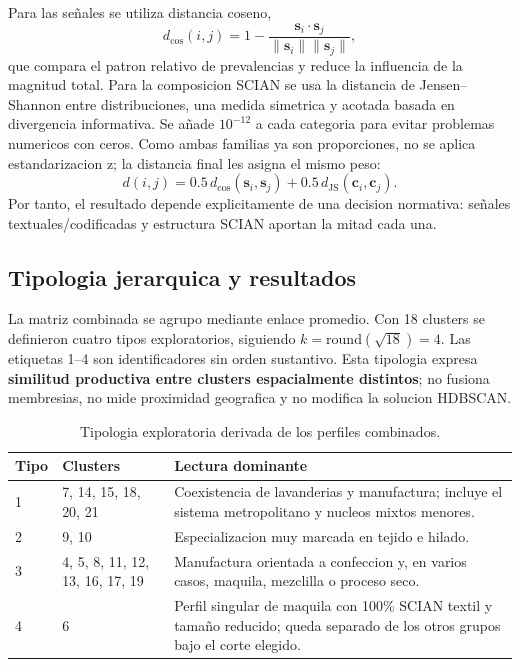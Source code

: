 \documentclass[11pt,letterpaper]{article}
\begin{document}
Para las señales se utiliza distancia coseno,
\[
d_{\mathrm{cos}}(i,j)=1-\frac{\mathbf{s}_i\cdot\mathbf{s}_j}{\lVert\mathbf{s}_i\rVert\lVert\mathbf{s}_j\rVert},
\]
que compara el patron relativo de prevalencias y reduce la influencia de la magnitud total. Para la composicion SCIAN se usa la distancia de Jensen--Shannon entre distribuciones, una medida simetrica y acotada basada en divergencia informativa. Se añade $10^{-12}$ a cada categoria para evitar problemas numericos con ceros. Como ambas familias ya son proporciones, no se aplica estandarizacion z; la distancia final les asigna el mismo peso:
\[
d(i,j)=0.5\,d_{\mathrm{cos}}(\mathbf{s}_i,\mathbf{s}_j)+0.5\,d_{\mathrm{JS}}(\mathbf{c}_i,\mathbf{c}_j).
\]
Por tanto, el resultado depende explicitamente de una decision normativa: señales textuales/codificadas y estructura SCIAN aportan la mitad cada una.

\subsection{Tipologia jerarquica y resultados}

La matriz combinada se agrupo mediante enlace promedio. Con 18 clusters se definieron cuatro tipos exploratorios, siguiendo $k=\mathrm{round}(\sqrt{18})=4$. Las etiquetas 1--4 son identificadores sin orden sustantivo. Esta tipologia expresa \textbf{similitud productiva entre clusters espacialmente distintos}; no fusiona membresias, no mide proximidad geografica y no modifica la solucion HDBSCAN.

\begin{table}[H]
\centering
\small
\caption{Tipologia exploratoria derivada de los perfiles combinados.}
\begin{tabularx}{\textwidth}{p{1.4cm}p{4.7cm}X}
\toprule
\textbf{Tipo} & \textbf{Clusters} & \textbf{Lectura dominante} \\
\midrule
1 & 7, 14, 15, 18, 20, 21 & Coexistencia de lavanderias y manufactura; incluye el sistema metropolitano y nucleos mixtos menores. \\
2 & 9, 10 & Especializacion muy marcada en tejido e hilado. \\
3 & 4, 5, 8, 11, 12, 13, 16, 17, 19 & Manufactura orientada a confeccion y, en varios casos, maquila, mezclilla o proceso seco. \\
4 & 6 & Perfil singular de maquila con 100\% SCIAN textil y tamaño reducido; queda separado de los otros grupos bajo el corte elegido. \\
\bottomrule
\end{tabularx}
\end{table}
\end{document}
